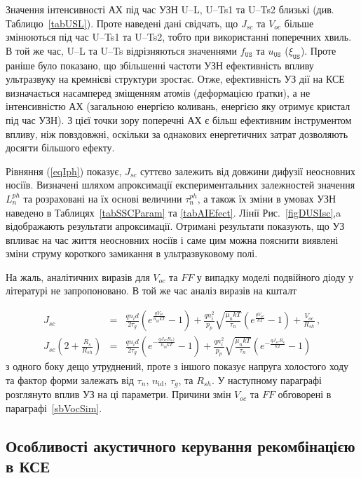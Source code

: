 Значення інтенсивності АХ під час УЗН U--L, U--Ts1 та U--Ts2 близькі (див. Таблицю~\ref{tabUSL}).
Проте наведені дані свідчать, що $J_{sc}$ та $V_{oc}$ більше змінюються під час U--Ts1 та U--Ts2, тобто при використанні поперечних хвиль.
В той же час, U--L та U--Ts відрізняються значеннями $f_\mathtt{US}$ та $u_\mathtt{US}$ ($\xi_\mathtt{US}$).
Проте раніше \cite{Olikh:FTP2011,Olikh:Ultras2016} було показано, що збільшенні частоти УЗН ефективність впливу ультразвуку
на кремнієві структури зростає.
Отже, ефективність УЗ дії на КСЕ визначається насамперед зміщенням атомів (деформацією ґратки),
а не інтенсивністю АХ (загальною енергією коливань, енергією яку отримує кристал під час УЗН).
З цієї точки зору поперечні АХ є більш ефективним інструментом впливу, ніж повздовжні,
оскільки за однакових енергетичних затрат дозволяють досягти більшого ефекту.

Рівняння (\ref{eqIph}) показує, $J_{sc}$ суттєво залежить від довжини дифузії неосновних носіїв.
Визначені шляхом апроксимації експериментальних залежностей значення $L_n^{ph}$ та розраховані на їх основі величини $\tau_n^{ph}$,
а також їх зміни в умовах УЗН наведено в Таблицях~\ref{tabSSCParam} та \ref{tabAIEfect}.
Лінії Рис.~\ref{figDUSIsc},a відображають результати апроксимації.
Отримані результати показують, що УЗ впливає на час життя неосновних носіїв і саме цим можна пояснити виявлені зміни струму короткого замикання в ультразвуковому полі.

На жаль, аналітичних виразів для $V_{oc}$ та $F\!F$ у випадку моделі подвійного діоду у літературі не запропоновано.
В той же час аналіз виразів на кшталт

\begin{eqnarray}
\label{eqSSCVoc}
 J_{sc}&=&\frac{qn_id}{2\tau_{g}}\left(e^{\frac{qV_{oc}}{n_\mathrm{id}kT}}-1\right)
+\frac{qn_i^2}{p_p}\sqrt{\frac{\mu_nkT}{\tau_n}}\left(e^{\frac{qV_{oc}}{kT}}-1\right)+\frac{V_{oc}}{R_{sh}}\,,\\
J_{sc}\left(2+\frac{R_s}{R_{sh}}\right)&=&\frac{qn_id}{2\tau_{g}}\left(e^{-\frac{qJ_{sc}R_s)}{n_\mathrm{id}kT}}-1\right)
+\frac{qn_i^2}{p_p}\sqrt{\frac{\mu_nkT}{\tau_n}}\left(e^{-\frac{qJ_{sc}R_s}{kT}}-1\right)
\end{eqnarray}
з одного боку дещо утруднений, проте з іншого показує напруга холостого ходу та фактор форми
залежать від $\tau_n$, $n_\mathrm{id}$, $\tau_g$, та $R_{sh}$.
У наступному параграфі розглянуто вплив УЗ на ці параметри.
Причини змін $V_{oc}$ та  $F\!F$ обговорені в параграфі~\ref{sbVocSim}.


\subsection{Особливості акустичного керування рекомбінацією в КСЕ\label{sbQNR}}

